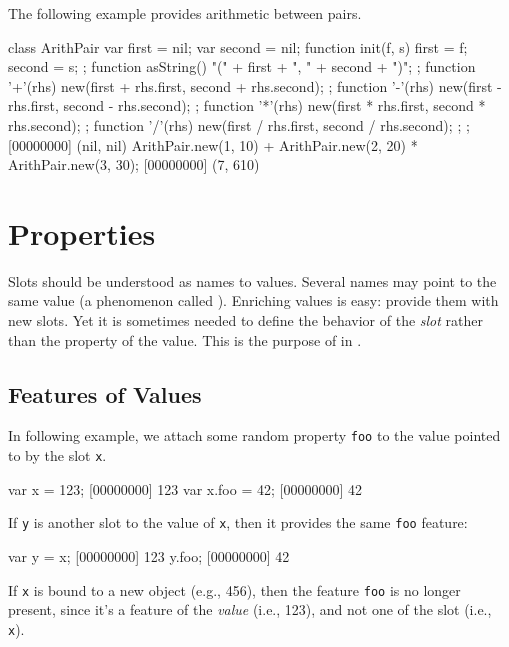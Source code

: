 The following example provides arithmetic between pairs.

\begin{urbiscript}
class ArithPair
{
  var first = nil;
  var second = nil;
  function init(f, s) { first = f;   second = s;  };
  function asString() { "(" + first + ", " + second + ")"; };
  function '+'(rhs) { new(first + rhs.first, second + rhs.second); };
  function '-'(rhs) { new(first - rhs.first, second - rhs.second); };
  function '*'(rhs) { new(first * rhs.first, second * rhs.second); };
  function '/'(rhs) { new(first / rhs.first, second / rhs.second); };
};
[00000000] (nil, nil)
ArithPair.new(1, 10) + ArithPair.new(2, 20) * ArithPair.new(3, 30);
[00000000] (7, 610)
\end{urbiscript}

\section{Properties}
\label{sec:tut:prop}

Slots should be understood as names to values.  Several names may point to
the same value (a phenomenon called ).  Enriching values is
easy: provide them with new slots.  Yet it is sometimes needed to define the
behavior of the \emph{slot} rather than the property of the value.  This is
the purpose of  in \us.

\subsection{Features of Values}
In following example, we attach some random property \lstinline|foo| to the
value pointed to by the slot \lstinline|x|.

\begin{urbiscript}
var x = 123;
[00000000] 123
var x.foo = 42;
[00000000] 42
\end{urbiscript}

If \lstinline|y| is another slot to the value of \lstinline|x|, then it
provides the same \lstinline|foo| feature:

\begin{urbiscript}
var y = x;
[00000000] 123
y.foo;
[00000000] 42
\end{urbiscript}

If \lstinline|x| is bound to a new object (e.g., 456), then the feature
\lstinline|foo| is no longer present, since it's a feature of the
\emph{value} (i.e., 123), and not one of the slot (i.e., \lstinline|x|).

